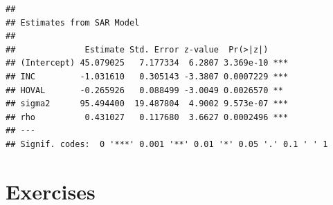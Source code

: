 \begin{knitrout}
\color{fgcolor}\begin{kframe}
\begin{alltt}
 \hlkwb{<-}  \hlopt{~}  \hlopt{+}     
\end{alltt}
\begin{verbatim}
## 
## Estimates from SAR Model 
## 
##              Estimate Std. Error z-value  Pr(>|z|)    
## (Intercept) 45.079025   7.177334  6.2807 3.369e-10 ***
## INC         -1.031610   0.305143 -3.3807 0.0007229 ***
## HOVAL       -0.265926   0.088499 -3.0049 0.0026570 ** 
## sigma2      95.494400  19.487804  4.9002 9.573e-07 ***
## rho          0.431027   0.117680  3.6627 0.0002496 ***
## ---
## Signif. codes:  0 '***' 0.001 '**' 0.01 '*' 0.05 '.' 0.1 ' ' 1
\end{verbatim}
\end{kframe}
\end{knitrout}


\section{Exercises}

